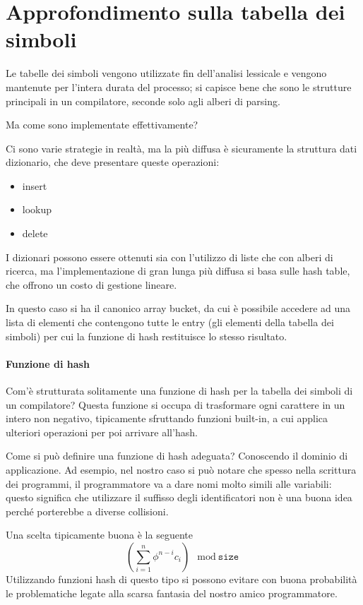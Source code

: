 \documentclass[class=book, crop=false, oneside, 12pt]{standalone}
\begin{document}
\section{Approfondimento sulla tabella dei simboli}
Le tabelle dei simboli vengono utilizzate fin dell'analisi lessicale e vengono mantenute per l'intera durata del processo; si capisce bene che sono le strutture principali in un compilatore, seconde solo agli alberi di parsing.

Ma come sono implementate effettivamente? 

Ci sono varie strategie in realtà, ma la più diffusa è sicuramente la struttura dati dizionario, che deve presentare queste operazioni:
\begin{itemize}
    \item insert
    \item lookup
    \item delete
\end{itemize}
I dizionari possono essere ottenuti sia con l'utilizzo di liste che con alberi di ricerca, ma l'implementazione di gran lunga più diffusa si basa sulle hash table, che offrono un costo di gestione lineare.

In questo caso si ha il canonico array bucket, da cui è possibile accedere ad una lista di elementi che contengono tutte le entry (gli elementi della tabella dei simboli) per cui la funzione di hash restituisce lo stesso risultato.

\paragraph{Funzione di hash} Com'è strutturata solitamente una funzione di hash per la tabella dei simboli di un compilatore?
Questa funzione si occupa di trasformare ogni carattere in un intero non negativo, tipicamente sfruttando funzioni built-in, a cui applica ulteriori operazioni per poi arrivare all'hash.

Come si può definire una funzione di hash adeguata?
Conoscendo il dominio di applicazione. Ad esempio, nel nostro caso si può notare che spesso nella scrittura dei programmi, il programmatore va a dare nomi molto simili alle variabili: questo significa che utilizzare il suffisso degli identificatori non è una buona idea perché porterebbe a diverse collisioni.

Una scelta tipicamente buona è la seguente
\begin{equation}
    (\sum_{i=1}^{n} \phi^{n-i}c_i) \mod \texttt{size}
\end{equation}
Utilizzando funzioni hash di questo tipo si possono evitare con buona probabilità le problematiche legate alla scarsa fantasia del nostro amico programmatore.
\end{document}
